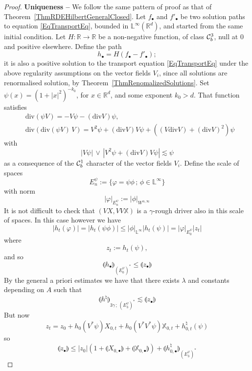 \documentclass[11pt,a4paper]{amsart}
\newcommand{\RR}{\mathbb{R}}  \newcommand{\CC}{\mathbb{C}}  \newcommand{\LL}{\mathbb{L}}  \newcommand{\WW}{\mathbb{W}}
\renewcommand{\leq}{\leqslant}
\theoremstyle{plain}%
\theoremstyle{definition}
\theoremstyle{remark}
\numberwithin{equation}{section} %
\begin{document}
\begin{proof}
{\bf Uniqueness --} We follow the same pattern of proof as that of Theorem~\ref{ThmRDEHilbertGeneralClosed}. Let $f_\bullet$ and $f'_\bullet$ be two solution paths to equation \eqref{EqTransportEq}, bounded in $\LL^\infty(\RR^d)$, and started from the same initial condition. Let $H : \RR\rightarrow\RR$ be a non-negative function, of class $\mathcal{C}^3_b$, null at $0$ and positive elsewhere. Define the path 
$$
h_\bullet = H(f_\bullet - f'_\bullet);
$$
it is also a positive solution to the transport equation \eqref{EqTransportEq} under the above regularity assumptions on the vector fields $V_i$, since all solutions are renormalised solution, by Theorem~\ref{ThmRenomalizedSolutions}. Set $\psi(x) = (1+|x|^2)^{-k_0}$, for $x\in\RR^d$, and some exponent $k_0>d$. That function satisfies 
\begin{equation*}
\begin{split}
&\textrm{div}(\psi V) = -V\psi - (\textrm{div}V)\psi, \\
&\textrm{div}(\textrm{div}(\psi V)\,V) = V^2\psi + (\textrm{div}V)V\psi + ((V\textrm{div}V)+(\textrm{div}V)^2)\psi  
\end{split}
\end{equation*}
with 
\begin{equation*}
|V\psi| \,\vee\, |V^2\psi + (\textrm{div}V)V\psi| \lesssim \psi
\end{equation*}
as a consequence of the $\mathcal{C}^1_b$ character of the vector fields $V_i$. 
Define the scale of spaces 
$$
E_n^\psi := \{\varphi = \psi \phi\,;\,\phi \in \LL^\infty\} 
$$
with norm 
$$
|\varphi|_{E_n^\psi} := |\phi|_{W^{n,\infty}}
$$ 
It is not difficult to check that $(V X, VV \mathbb{X})$ is a $\gamma$-rough driver also in this scale of spaces. In this case however we have
$$
|h_t(\varphi)| = |h_t ( \psi \phi)| \leq |\phi|_{\LL^\infty} |h_t( \psi)| = |\varphi|_{E^\psi_0}|z_t|
$$
where 
$$
z_t := h_t(\psi), 
$$
and so
$$
\llparenthesis h_\bullet\rrparenthesis_{(E_0^\psi)^*}\leq \llparenthesis z_\bullet \rrparenthesis
$$
By the general a priori estimates we have that there exists $\lambda$ and constants depending on $A$ such that
$$
\llparenthesis h^\natural \rrparenthesis_{3\gamma\,;\,(E_3^\psi)^*} \lesssim \llparenthesis z_\bullet \rrparenthesis
$$
But now
$$
z_t = z_0 +  h_{0}(V^* \psi)X_{0,t}+  h_{0}(V^*V^* \psi)\mathbb{X}_{0,t} + h^\natural_{0,t}(\psi)
$$
so
$$
\llparenthesis z_\bullet \rrparenthesis \leq |z_0| (1+ \llparenthesis X_{0, \bullet} \rrparenthesis+ \llparenthesis \mathbb{X}_{0,\bullet} \rrparenthesis) + \llparenthesis h^\natural_{0,\bullet} \rrparenthesis_{(E_3^\psi)^*}
$$
\end{proof}
\end{document}
